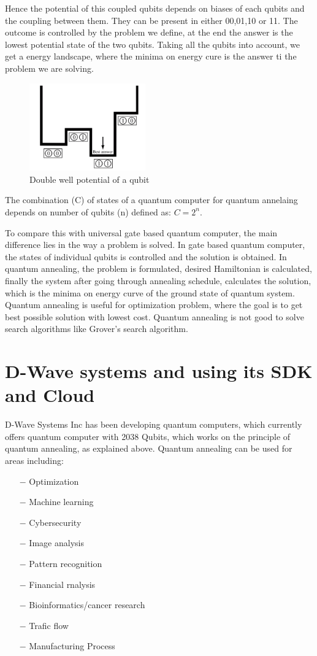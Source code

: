 \documentclass[12pt,conference]{IEEEtran}
\begin{document}
Hence the potential of this coupled qubits depends on biases of each qubits and the coupling between them. They can be present in either 00,01,10 or 11. The outcome is controlled by the problem we define, at the end the answer is the lowest potential state of the two qubits. Taking all the qubits into account, we get a energy landscape, where the minima on energy cure is the answer ti the problem we are solving. 

\begin{figure}[h]
  \centering
  \includegraphics[width=5cm]{entangled_low.png}
  \caption{Double well potential of a qubit}
  \label{fig:ELQbit}
\end{figure}

The combination (C) of states of a quantum computer for quantum annelaing depends on number of qubits (n) defined as: $ C = 2^n$.

To compare this with universal gate based quantum computer, the main difference lies in the way a problem is solved. In gate based quantum computer, the states of individual qubits is controlled and the solution is obtained. In quantum annealing, the problem is formulated, desired Hamiltonian is calculated, finally the system after going through annealing schedule\cite{1}, calculates the solution, which is the minima on energy curve of the ground state of quantum system. Quantum annealing is useful for optimization problem, where the goal is to get best possible solution with lowest cost. Quantum annealing is not good to solve search algorithms like Grover's search algorithm. 

\section{D-Wave systems and using its SDK and Cloud}
D-Wave Systems Inc has been developing quantum computers, which currently offers quantum computer with 2038 Qubits, which works on the principle of quantum annealing, as explained above. Quantum annealing can be used for areas including:
\begin{itemize}
  \item[$-$] Optimization 
  \item[$-$] Machine learning
  \item[$-$] Cybersecurity
  \item[$-$] Image analysis
  \item[$-$] Pattern recognition
  \item[$-$] Financial rnalysis
  \item[$-$] Bioinformatics/cancer research
  \item[$-$] Trafic flow 
  \item[$-$] Manufacturing Process
\end{itemize}
\end{document}
